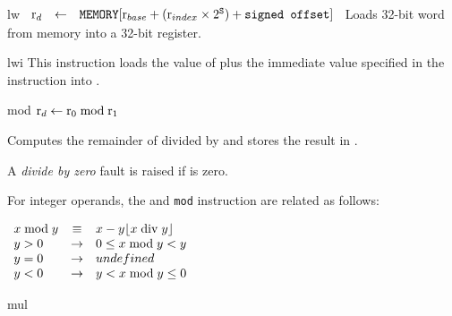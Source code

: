 \begin{instruction}{lw}
     {\lwopc}
     {
       \begin{math}
         \begin{array}{lcl}
           {\ensuremath{\textrm{r}_{d}}} & \leftarrow & \texttt{MEMORY}[\textrm{r}_{base} +
            (\textrm{r}_{index} \times 2^{\texttt{S}}) + \texttt{signed offset}] \\
         \end{array}
       \end{math}
     }
     {
       Loads 32-bit word from memory into a 32-bit register.
     }
\end{instruction}


\begin{instruction}{lwi}
     {\lwiopc}
     {
       This instruction loads the value of  plus the
       immediate value specified in the instruction into \dr.
     }
\end{instruction}

\begin{instruction}{mod}\label{inst:mod}
     {\amodopc}
     {$\textrm{r}_{d} \leftarrow \textrm{r}_{0} \bmod \textrm{r}_{1}$}
     {
       Computes the remainder of  divided by  and stores
       the result in \dr.

       A \emph{divide by zero} fault is raised if  is zero.

       For integer operands, the  and \texttt{mod}
       instruction are related as follows:

       \begin{math}
         \begin{array}{lcl}
           x \bmod y & \equiv  & x - y \lfloor {x \bdiv y} \rfloor \\
           y > 0 & \rightarrow & 0 \leq x \bmod y < y \\
           y = 0 & \rightarrow & undefined \\
           y < 0 & \rightarrow & y < x \bmod y \leq 0 \\
         \end{array}
       \end{math}
     }
\end{instruction}

\begin{instruction}{mul}
\end{instruction}

